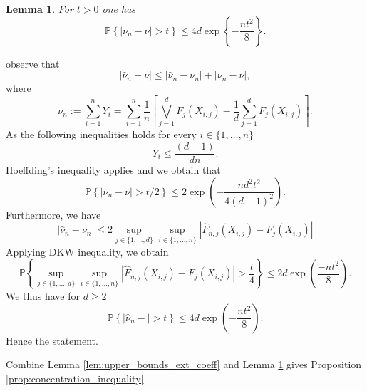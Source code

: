 \documentclass[11pt]{article}
\makeatletter
\newtheorem{lemma}{Lemma}
\renewenvironment{proof}[1][\proofname]{\par
\pushQED{\qed}%
\normalfont \topsep6\p@\@plus6\p@\relax
\trivlist
\item\relax
{\textbf{
#1\@addpunct{ }}}\hspace\labelsep\ignorespaces
}{%
\popQED\endtrivlist\@endpefalse
}
\makeatother
\begin{document}
	\begin{lemma}
		\label{lem:mado_concent}
		For $t > 0$ one has
		\begin{equation*}
			\mathbb{P}\left\{ |\nu_n - \nu | > t \right\} \leq 4 d \exp \left\{ -\frac{n t^2}{8} \right\}.
		\end{equation*}
	\end{lemma}
	\begin{proof}
		observe that
		\begin{equation*}
			|\hat{\nu}_n - \nu| \leq |\hat{\nu}_n - \nu_n | + |\nu_n - \nu |,
		\end{equation*}
		where
		\begin{equation*}
			\nu_n := \sum_{i=1}^n Y_i = \sum_{i=1}^n \frac{1}{n} \left[ \bigvee_{j=1}^d  F_j(X_{i,j})  - \frac{1}{d} \sum_{j=1}^d F_j(X_{i,j})  \right].
		\end{equation*}
		As the following inequalities holds for every $i \in \{1,\dots,n\}$
		\begin{equation*}
			Y_i \leq \frac{(d-1)}{dn}.
		\end{equation*}
		Hoeffding's inequality applies and we obtain that
		\begin{equation*}
			\mathbb{P}\left\{ |\nu_n - \nu | > t / 2 \right\} \leq 2 \exp\left( - \frac{n d^2 t^2}{4(d-1)^2} \right).
		\end{equation*}
		Furthermore, we have 
		\begin{equation*}
			|\hat{\nu}_n - \nu_n | \leq 2 \underset{j \in \{1,\dots,d\}}{\sup}\underset{i \in \{1,\dots,n\}}{\sup} \left|\hat{F}_{n,j}(X_{i,j})- F_{j}(X_{i,j}) \right|
		\end{equation*}
		Applying DKW inequality, we obtain
		\begin{equation*}
			\mathbb{P}\left\{ \underset{j \in \{1,\dots,d\}}{\sup}\underset{i \in \{1,\dots,n\}}{\sup} \left|\hat{F}_{n,j}(X_{i,j}) -  F_{j}(X_{i,j}) \right|> \frac{t}{4}\right\} \leq 2d \exp\left( \frac{-nt^2}{8} \right).
		\end{equation*}
		We thus have for $d \geq 2$
		\begin{equation*}
			\mathbb{P}\left\{ \left| \hat{\nu}_n-  \right| > t \right\} \leq 4d\exp\left(- \frac{n t^2}{8} \right).
		\end{equation*}
		Hence the statement.
	\end{proof}
	
	Combine Lemma \ref{lem:upper_bounds_ext_coeff} and Lemma \ref{lem:mado_concent} gives Proposition \ref{prop:concentration_inequality}.
	
\end{document}

